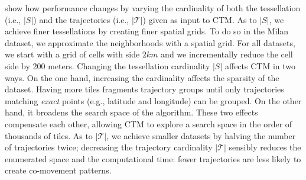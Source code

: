 \documentclass[preprint,12pt,authoryear]{elsarticle} %
\renewcommand{\sf}[1]{\textsf{\textup{#1}}}
\begin{document}
 show how performance changes by varying the cardinality of both the tessellation (i.e., $|S|$) and the trajectories (i.e., $|\mathcal{T}|$) given as input to CTM.
As to $|S|$, we achieve finer tessellations by creating finer spatial grids. To do so in the \sf{Milan} dataset, we approximate the neighborhoods with a spatial grid.
For all datasets, we start with a grid of cells with side $2km$ and we incrementally reduce the cell side by 200 meters.
Changing the tessellation cardinality $|S|$ affects CTM in two ways.
On the one hand, increasing the cardinality affects the sparsity of the dataset.
Having more tiles fragments trajectory groups until only trajectories matching \textit{exact} points (e.g., latitude and longitude) can be grouped.
On the other hand, it broadens the search space of the algorithm.
These two effects compensate each other, allowing CTM to explore a search space in the order of thousands of tiles.
As to $|\mathcal{T}|$, we achieve smaller datasets by halving the number of trajectories twice;
decreasing the trajectory cardinality $|\mathcal{T}|$ sensibly reduces the enumerated space and the computational time:
fewer trajectories are less likely to create 
co-movement patterns. %
\end{document}
